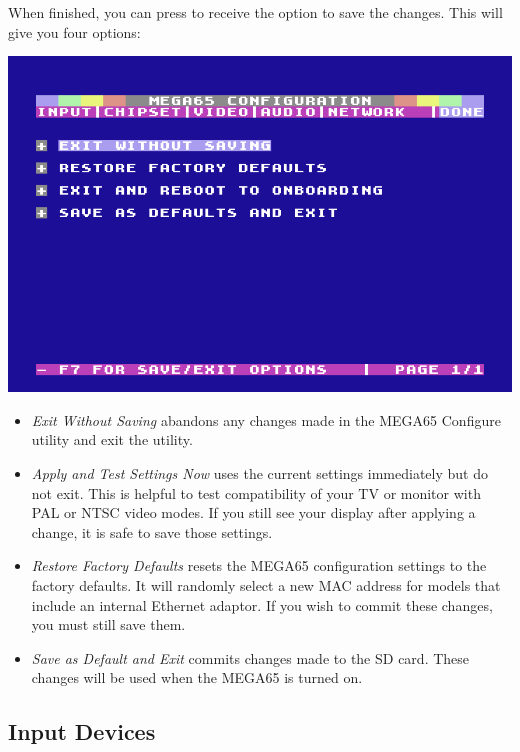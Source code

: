 \begin{minipage}{\linewidth}
  When finished, you can press  to receive the
  option to save the changes. This will give you four options:

  \vspace{5mm}
  \includegraphics[width=\linewidth]{images/ss-m65config-save.png}
\end{minipage}

\begin{itemize}
  \item{\em Exit Without Saving} abandons any changes made in the MEGA65 Configure utility and exit the utility.
  \item{\em Apply and Test Settings Now} uses the current settings immediately but do not exit. This is helpful to test compatibility of your TV or monitor with PAL or NTSC video modes. If you still see your display after applying a change, it is safe to save those settings.
  \item{\em Restore Factory Defaults} resets the MEGA65 configuration settings to the factory defaults. It will randomly select a new MAC address for models that include an internal Ethernet adaptor. If you wish to commit these changes, you must still save them.
  \item{\em Save as Default and Exit} commits changes made to the SD card. These changes will be used when the MEGA65 is turned on.
\end{itemize}

\subsection{Input Devices}

